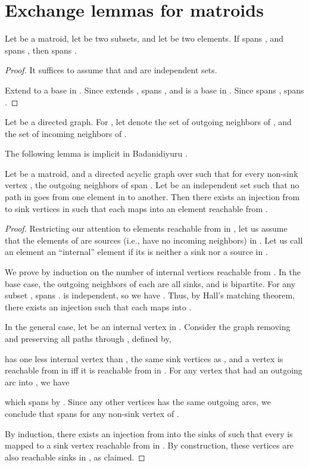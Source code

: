 \documentclass[oneside,letterpaper]{scrartcl} \usepackage{macros}
\begin{document}


\appendix





\section{Exchange lemmas for matroids}

\begin{lemma}
  Let  be a matroid, let  be
  two subsets, and let  be two elements.  If 
  spans , and  spans , then  spans .
\end{lemma}
\begin{proof}
  It suffices to assume that  and  are independent sets.

  Extend  to a base  in . Since  extends
  ,  spans , and  is a base in . Since  spans ,  spans .
\end{proof}


Let  be a directed graph. For , let
 denote the set of outgoing neighbors of ,
and  the set of incoming neighbors of .

The following lemma is implicit in Badanidiyuru \cite{abv-11}.
\begin{lemma}
  Let  be a matroid, and  a directed acyclic
  graph over  such that for every non-sink vertex , the outgoing neighbors  of 
  {span} . Let  be an independent set such that no path
  in  goes from one element in  to another. Then
  there exists an injection from  to sink vertices in
   such that each  maps into an element
  reachable from .
\end{lemma}
\begin{proof}
  Restricting our attention to elements reachable from  in
  , let us assume that the elements of  are sources
  (i.e., have no incoming neighbors) in . Let us call an
  element  an ``internal'' element if its is neither
  a sink nor a source in .

  We prove by induction on the number of internal vertices reachable
  from . In the base case, the outgoing neighbors of each  are all sinks, and  is bipartite. For any
  subset ,  spans .
   is independent, so we have . Thus, by Hall's matching
  theorem, there exists an injection  such that each  maps
  into .

  In the general case, let  be an
  internal vertex in . Consider the graph  removing
   and preserving all paths through , defined by,
  
   has one less internal vertex than , the same sink
  vertices as , and a vertex  is
  reachable from  in  iff it is reachable from
   in . For any vertex  that had an outgoing arc into , we
  have
  
  which spans  by . Since any other
  vertices has the same outgoing arcs, we conclude that
   spans  for any non-sink vertex
  of .

  By induction, there exists an injection from  into the
  sinks of  such that every  is mapped to a
  sink vertex reachable from  in . By construction, these
  vertices are also reachable sinks in , as claimed.
\end{proof}
\end{document}
